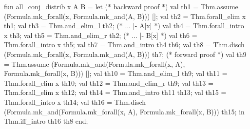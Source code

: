 \nwenddocs{}\plusendmoddef\nwstartdeflinemarkup{}\nwenddeflinemarkup
fun all_conj_distrib x A B =
  let
    (* backward proof *)
    val th1 = Thm.assume (Formula.mk_forall(x, Formula.mk_and(A, B))) [];
    val th2 = Thm.forall_elim x th1;
    val th3 = Thm.and_elim_l th2; (* ... |- A[x] *)
    val th4 = Thm.forall_intro x th3;
    val th5 = Thm.and_elim_r th2; (* ... |- B[x] *)
    val th6 = Thm.forall_intro x th5;
    val th7 = Thm.and_intro th4 th6;
    val th8 = Thm.disch (Formula.mk_forall(x, Formula.mk_and(A, B))) th7;
    (* forward proof *)
    val th9 = Thm.assume (Formula.mk_and(Formula.mk_forall(x, A),
                                         Formula.mk_forall(x, B)))
                         [];
    val th10 = Thm.and_elim_l th9;
    val th11 = Thm.forall_elim x th10;
    val th12 = Thm.and_elim_r th9;
    val th13 = Thm.forall_elim x th12;
    val th14 = Thm.and_intro th11 th13;
    val th15 = Thm.forall_intro x th14;
    val th16 = Thm.disch (Formula.mk_and(Formula.mk_forall(x, A),
                                         Formula.mk_forall(x, B)))
                         th15;
  in
    Thm.iff_intro th16 th8
  end;
\eatline
